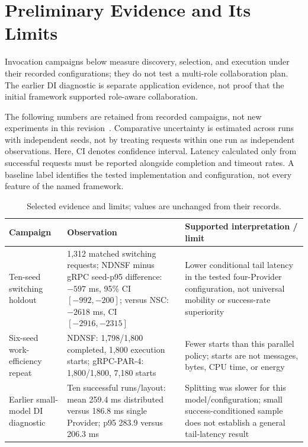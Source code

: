 \section{Preliminary Evidence and Its Limits}
Invocation campaigns below measure discovery, selection, and execution under their recorded configurations; they do not test a multi-role collaboration plan. The earlier DI diagnostic is separate application evidence, not proof that the initial framework supported role-aware collaboration.

The following numbers are retained from recorded campaigns, not new experiments in this revision~\cite{ndnsfevidence}. Comparative uncertainty is estimated across runs with independent seeds, not by treating requests within one run as independent observations. Here, CI denotes confidence interval. Latency calculated only from successful requests must be reported alongside completion and timeout rates. A baseline label identifies the tested implementation and configuration, not every feature of the named framework.

\begin{table}[htbp]
\centering\small
\caption{Selected evidence and limits; values are unchanged from their records.}
\begin{tabularx}{\textwidth}{p{}p{}X}
\toprule
Campaign & Observation & Supported interpretation / limit\\\midrule
Ten-seed switching holdout & 1,312 matched switching requests; NDNSF minus gRPC seed-p95 difference: $-597$ ms, 95\% CI $[-992,-200]$; versus NSC: $-2618$ ms, CI $[-2916,-2315]$ & Lower conditional tail latency in the tested four-Provider configuration, not universal mobility or success-rate superiority\\\midrule
Six-seed work-efficiency repeat & NDNSF: 1,798/1,800 completed, 1,800 execution starts; gRPC-PAR-4: 1,800/1,800, 7,180 starts & Fewer starts than this parallel policy; starts are not messages, bytes, CPU time, or energy\\\midrule
Earlier small-model DI diagnostic & Ten successful runs/layout: mean 259.4 ms distributed versus 186.8 ms single Provider; p95 283.9 versus 206.3 ms & Splitting was slower for this model/configuration; small success-conditioned sample does not establish a general tail-latency result\\\bottomrule
\end{tabularx}
\end{table}

